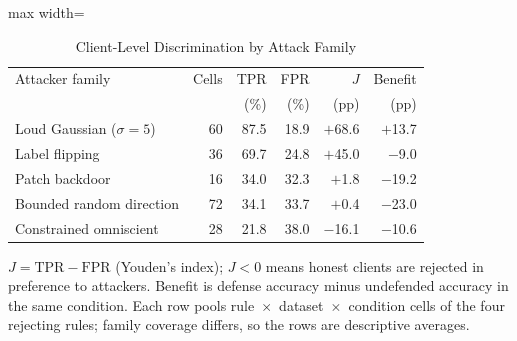 \begin{table}[!t]
\centering\footnotesize
\setlength{\tabcolsep}{4pt}
\caption{Client-Level Discrimination by Attack Family}\label{tab:discrimination}
\begin{adjustbox}{max width=\columnwidth}
\begin{tabular}{lrrrrr}
\toprule
Attacker family & Cells & TPR & FPR & $J$ & Benefit \\
 &  & (\%) & (\%) & (pp) & (pp) \\
\midrule
Loud Gaussian ($\sigma=5$) & 60 & 87.5 & 18.9 & $+$68.6 & $+$13.7 \\
Label flipping & 36 & 69.7 & 24.8 & $+$45.0 & $-$9.0 \\
Patch backdoor & 16 & 34.0 & 32.3 & $+$1.8 & $-$19.2 \\
Bounded random direction & 72 & 34.1 & 33.7 & $+$0.4 & $-$23.0 \\
Constrained omniscient & 28 & 21.8 & 38.0 & $-$16.1 & $-$10.6 \\
\bottomrule
\end{tabular}
\end{adjustbox}

\par\vspace{3pt}\parbox{\linewidth}{\footnotesize $J=\mathrm{TPR}-\mathrm{FPR}$ (Youden's index); $J<0$ means honest clients are rejected in preference to attackers. Benefit is defense accuracy minus undefended accuracy in the same condition. Each row pools rule~$\times$~dataset~$\times$~condition cells of the four rejecting rules; family coverage differs, so the rows are descriptive averages.}
\end{table}
